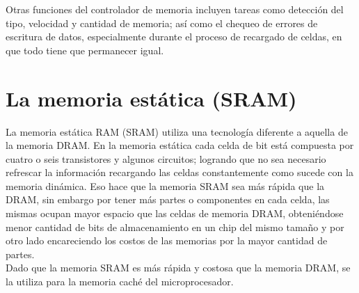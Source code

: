 \documentclass{article}
\begin{document}
Otras funciones del controlador de memoria incluyen tareas como detección del tipo, velocidad
y cantidad de memoria; así como el chequeo de errores de escritura de datos, especialmente
durante el proceso de recargado de celdas, en que todo tiene que permanecer igual.
\section*{La memoria estática (SRAM)}
La memoria estática RAM (SRAM) utiliza una tecnología diferente a aquella de la memoria
DRAM. En la memoria estática cada celda de bit está compuesta por cuatro o seis transistores y
algunos circuitos; logrando que no sea necesario refrescar la información recargando las celdas
constantemente como sucede con la memoria dinámica. Eso hace que la memoria SRAM sea
más rápida que la DRAM, sin embargo por tener más partes o componentes en cada celda, las
mismas ocupan mayor espacio que las celdas de memoria DRAM, obteniéndose menor cantidad
de bits de almacenamiento en un chip del mismo tamaño y por otro lado encareciendo los costos
de las memorias por la mayor cantidad de partes.\\[0.1cm]
Dado que la memoria SRAM es más rápida y costosa que la memoria DRAM, se la utiliza para la
memoria caché del microprocesador.
\end{document}
